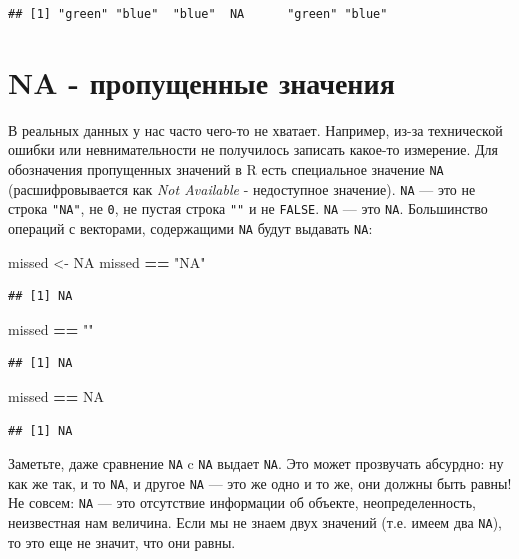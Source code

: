 \documentclass[]{book}
\newenvironment{Shaded}{\begin{snugshade}}{\end{snugshade}}
\newcommand{\StringTok}[1]{\textcolor[rgb]{0.31,0.60,0.02}{#1}}
\newcommand{\OtherTok}[1]{\textcolor[rgb]{0.56,0.35,0.01}{#1}}
\newcommand{\OperatorTok}[1]{\textcolor[rgb]{0.81,0.36,0.00}{\textbf{#1}}}
\newcommand{\NormalTok}[1]{#1}
\begin{document}
\begin{verbatim}
## [1] "green" "blue"  "blue"  NA      "green" "blue"
\end{verbatim}

\section{NA - пропущенные значения}\label{na}

В реальных данных у нас часто чего-то не хватает. Например, из-за
технической ошибки или невнимательности не получилось записать какое-то
измерение. Для обозначения пропущенных значений в R есть специальное
значение \texttt{NA} (расшифровывается как \emph{Not Available} -
недоступное значение). \texttt{NA} --- это не строка \texttt{"NA"}, не
\texttt{0}, не пустая строка \texttt{""} и не \texttt{FALSE}.
\texttt{NA} --- это \texttt{NA}. Большинство операций с векторами,
содержащими \texttt{NA} будут выдавать \texttt{NA}:

\begin{Shaded}
\begin{Highlighting}[]
\NormalTok{missed <-}\StringTok{ }\OtherTok{NA}
\NormalTok{missed }\OperatorTok{==}\StringTok{ "NA"}
\end{Highlighting}
\end{Shaded}

\begin{verbatim}
## [1] NA
\end{verbatim}

\begin{Shaded}
\begin{Highlighting}[]
\NormalTok{missed }\OperatorTok{==}\StringTok{ ""}
\end{Highlighting}
\end{Shaded}

\begin{verbatim}
## [1] NA
\end{verbatim}

\begin{Shaded}
\begin{Highlighting}[]
\NormalTok{missed }\OperatorTok{==}\StringTok{ }\OtherTok{NA}
\end{Highlighting}
\end{Shaded}

\begin{verbatim}
## [1] NA
\end{verbatim}

Заметьте, даже сравнение \texttt{NA} c \texttt{NA} выдает \texttt{NA}.
Это может прозвучать абсурдно: ну как же так, и то \texttt{NA}, и другое
\texttt{NA} --- это же одно и то же, они должны быть равны! Не совсем:
\texttt{NA} --- это отсутствие информации об объекте, неопределенность,
неизвестная нам величина. Если мы не знаем двух значений (т.е. имеем два
\texttt{NA}), то это еще не значит, что они равны.
\end{document}
